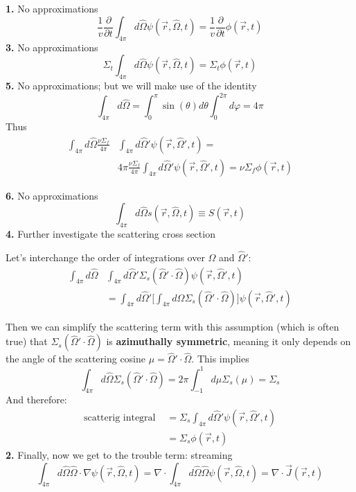 \documentclass[12pt]{article}
\newcommand{\vOmega}{\ensuremath{\hat{\Omega}}}
\begin{document}
\textbf{1.} No approximations
\begin{equation}
\frac{1}{v}\frac{\partial}{\partial t} \int_{4\pi} d\vOmega  \psi(\vec{r}, \vOmega, t) = \boxed{\frac{1}{v}\frac{\partial}{\partial t}\phi(\vec{r}, t)}
\end{equation}
\textbf{3.} No approximations
\begin{equation}
\Sigma_t \int_{4\pi} d\vOmega \psi(\vec{r}, \vOmega, t) = \boxed{\Sigma_t \phi(\vec{r}, t)}
\end{equation}
\textbf{5.} No approximations; but we will make use of the identity
\[\int_{4\pi} d\vOmega = \int_0^{\pi} \sin(\theta) d\theta \int_0^{2\pi} d\varphi = 4\pi \]
Thus
\begin{align}
\int_{4\pi} d\vOmega \frac{\nu \Sigma_f}{4\pi} &\int_{4\pi} d\vOmega' \psi(\vec{r},\vOmega', t) = \\
& 4\pi \frac{\nu \Sigma_f}{4\pi} \int_{4\pi} d\vOmega' \psi(\vec{r},\vOmega', t) = \boxed{\nu \Sigma_f \phi(\vec{r}, t)}
\end{align}

\textbf{6.} No approximations
\begin{equation}
\int_{4\pi} d\vOmega s(\vec{r}, \vOmega, t) \equiv \boxed{S(\vec{r}, t)}
\end{equation}
\textbf{4.} Further investigate the scattering cross section

Let's interchange the order of integrations over $\vOmega$ and $\vOmega'$:
%
\begin{align}
\int_{4\pi} d\vOmega &\int_{4\pi} d\vOmega' \Sigma_s(\vOmega' \cdot \vOmega) \psi(\vec{r}, \vOmega', t)\\
%
&= \int_{4\pi} d\vOmega' \bigl[ \int_{4\pi} d\vOmega \Sigma_s(\vOmega' \cdot \vOmega)\bigr] \psi(\vec{r}, \vOmega', t)
\end{align}

Then we can simplify the scattering term with this assumption (which is often true) that $\Sigma_s(\vOmega' \cdot \vOmega)$ is \textbf{azimuthally symmetric}, meaning it only depends on the angle of the scattering cosine $\mu =\vOmega' \cdot \vOmega$.  This implies
\[\int_{4\pi} d\vOmega \Sigma_s(\vOmega' \cdot \vOmega) = 2\pi \int_{-1}^{1} d\mu \Sigma_s(\mu) = \Sigma_s\]
%
And therefore:
%
\begin{align}
\text{scatterig integral }&= \Sigma_s \int_{4\pi} d\vOmega' \psi(\vec{r}, \vOmega', t) \\
%
&= \boxed{\Sigma_s \phi(\vec{r}, t)}
\end{align}
\textbf{2.} Finally, now we get to the trouble term: streaming
%
\[\int_{4\pi} d\vOmega \vOmega \cdot \nabla \psi(\vec{r}, \vOmega, t) = \nabla \cdot \int_{4\pi} d\vOmega \vOmega \psi(\vec{r}, \vOmega, t) = \nabla \cdot \vec{J}(\vec{r}, t) \]
\end{document}

